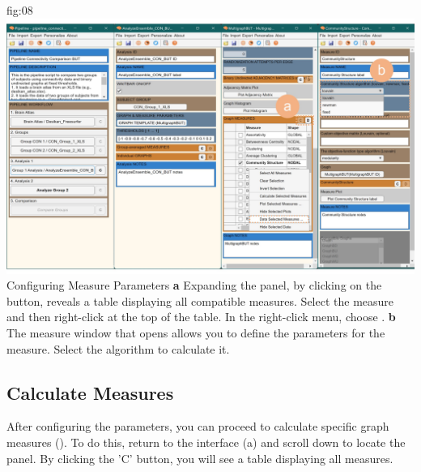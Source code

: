 \documentclass[justified]{tufte-handout}
\begin{document}
	{fig:08}
	{
	\includegraphics{fig08.jpg}
	}
	{Configuring Measure Parameters}
	{
	{\bf a} Expanding the  panel, by clicking on the  button, reveals a table displaying all compatible measures. 
	Select the  measure and then right-click at the top of the table. In the right-click menu, choose .
	{\bf b} The measure window that opens allows you to define the parameters for the  measure. Select the  algorithm to calculate it.
	}

\clearpage
\subsection{Calculate Measures}
 
After configuring the parameters, you can proceed to calculate specific graph measures (). To do this, return to the  interface (a) and scroll down to locate the  panel. By clicking the 'C' button, you will see a table displaying all measures.
\end{document}
